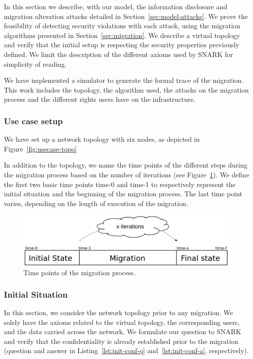 \label{sec:model-usecase}
In this section we describe, with our model, the information disclosure and migration alteration attacks detailed in Section~\ref{sec:model-attacks}.
We prove the feasibility of detecting security violations with each attack, using the migration algorithms presented in Section~\ref{sec:migration}.
We describe a virtual topology and verify that the initial setup is respecting the security properties previously defined.
We limit the description of the different axioms used by SNARK for simplicity of reading.

We have implemented a simulator to generate the formal trace of the migration.
This work includes the topology, the algorithm used, the attacks on the migration process and the different rights users have on the infrastructure.

\subsubsection{Use case setup}
We have set up a network topology with six nodes, as depicted in Figure~\ref{fig:usecase-topo}




In addition to the topology, we name the time points of the different steps during the migration process based on the number of iterations (see Figure~\ref{fig:time-points}).
We define the first two basic time points time-0 and time-1 to respectively represent the initial situation and the beginning of the migration process. The last time point varies, depending on the length of execution of the migration.


\begin{figure}[htbp]
\centering
\includegraphics[scale=0.5]{figures/time-points-evolution} 
\caption{Time points of the migration process.\label{fig:time-points}}
\end{figure}

\subsubsection{Initial Situation}
In this section, we consider the network topology prior to any migration.
We solely have the axioms related to the virtual topology, the corresponding users, and the data carried across the network.
We formulate our question to SNARK and verify that the confidentiality is already established prior to the migration (question and answer in Listing~\ref{lst:init-conf-q} and~\ref{lst:init-conf-a}, respectively).



